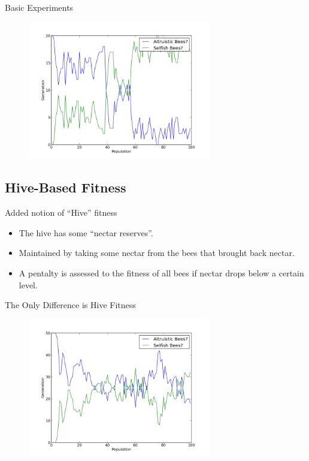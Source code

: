 \documentclass{beamer}
\begin{document}
    \begin{frame}{Basic Experiments}
        \begin{figure}
            
        \includegraphics[width=8cm]{s_bees.png}
        \end{figure}

    \end{frame}

    \subsection{Hive-Based Fitness}

    \begin{frame}{Added notion of ``Hive'' fitness}
        \begin{itemize}
            \item The hive has some ``nectar reserves''.
            \item Maintained by taking some nectar from the bees that brought back nectar.
            \item A pentalty is assessed to the fitness of all bees if nectar drops below a certain 
                  level.
        \end{itemize}
    \end{frame}

    \begin{frame}{The Only Difference is Hive Fitness}
        \begin{figure}
        \includegraphics[width=8cm]{hive_influenced_bees.png}
        \end{figure}
    \end{frame}
\end{document}
